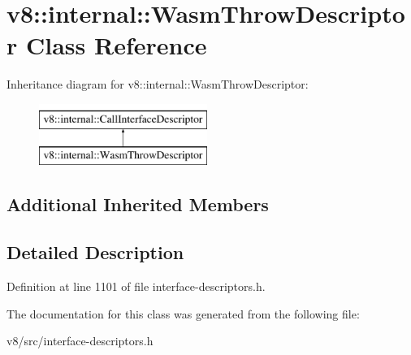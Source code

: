 \hypertarget{classv8_1_1internal_1_1WasmThrowDescriptor}{}\section{v8\+:\+:internal\+:\+:Wasm\+Throw\+Descriptor Class Reference}
\label{classv8_1_1internal_1_1WasmThrowDescriptor}
Inheritance diagram for v8\+:\+:internal\+:\+:Wasm\+Throw\+Descriptor\+:\begin{figure}[H]
\begin{center}
\leavevmode
\includegraphics[height=2.000000cm]{classv8_1_1internal_1_1WasmThrowDescriptor}
\end{center}
\end{figure}
\subsection*{Additional Inherited Members}


\subsection{Detailed Description}


Definition at line 1101 of file interface-\/descriptors.\+h.



The documentation for this class was generated from the following file\+:\begin{DoxyCompactItemize}
\item 
v8/src/interface-\/descriptors.\+h\end{DoxyCompactItemize}
